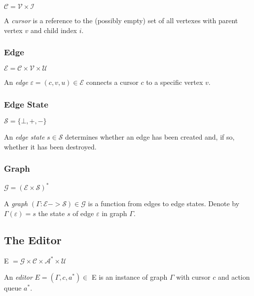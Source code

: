 \documentclass[letterpaper,12pt]{article}
\def\A{\mathcal{A}}
\def\C{\mathcal{C}}
\def\E{\mathcal{E}}
\def\G{\mathcal{G}}
\def\I{\mathcal{I}}
\def\S{\mathcal{S}}
\def\U{\mathcal{U}}
\def\V{\mathcal{V}}
\def\e{\varepsilon}
\begin{document}
$\C = \V \times \I$

A \emph{cursor} is a reference to the (possibly empty) set of all vertexes
with parent vertex $v$ and child index $i$.


\subsubsection{Edge}
\label{sec:edge}

$\E = \C \times \V \times \U$

An \emph{edge} $\e = (c, v, u) \in \E$ connects a cursor $c$ to a specific
vertex $v$.


\subsubsection{Edge State}
\label{sec:edge-state}

$\S = \{\bot,+,-\}$

An \emph{edge state} $s \in \S$ determines whether an edge has been created
and, if so, whether it has been destroyed.


\subsubsection{Graph}
\label{sec:graph}

$\G = (\E \times \S)^{*}$

A \emph{graph} $(\Gamma : \E -> \S) \in \G$ is a function from edges to edge
states. Denote by $\Gamma(\e) = s$ the state $s$ of edge $\e$ in graph
$\Gamma$.


\subsection{The Editor}
\label{sec:the-editor}

E $= \G \times \C \times \A^{*} \times \U$

An \emph{editor} $E = (\Gamma,c,a^{*}) \in$ E is an instance of graph $\Gamma$
with cursor $c$ and action queue $a^{*}$.
\end{document}
